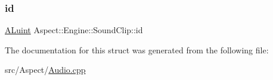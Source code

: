 \subsubsection{\texorpdfstring{id}{id}}
{\footnotesize\ttfamily \mbox{\hyperlink{al_8h_ae0292edc5c1c47db9accee3f49933e6f}{A\+Luint}} Aspect\+::\+Engine\+::\+Sound\+Clip\+::id}



The documentation for this struct was generated from the following file\+:\begin{DoxyCompactItemize}
\item 
src/\+Aspect/\mbox{\hyperlink{_audio_8cpp}{Audio.\+cpp}}\end{DoxyCompactItemize}

